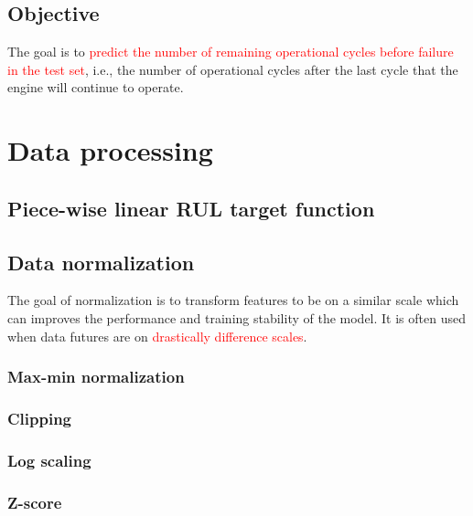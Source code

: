 \documentclass{article}
\DeclareRobustCommand{\&}{%
	\ifdim\fontdimen1\font>0pt
	\textsl{\symbol{`\&}}%
	\else
	\symbol{`\&}%
	\fi
}
\newcommand{\red}[1]{\textcolor{red}{#1}}
\begin{document}
\subsection{Objective}
The goal is to \red{predict the number of remaining operational cycles before failure in the test set}, i.e., the number of operational cycles after the last cycle that the engine will continue to operate.

\section{Data processing}
\subsection{Piece-wise linear RUL target function}
\subsection{Data normalization}
The goal of normalization is to transform features to be on a similar scale which can improves the performance and training stability of the model. It is often used when data futures are on \red{drastically difference scales}.

\subsubsection{Max-min normalization}
\subsubsection{Clipping}
\subsubsection{Log scaling}
\subsubsection{Z-score}
\printbibliography
\end{document}
